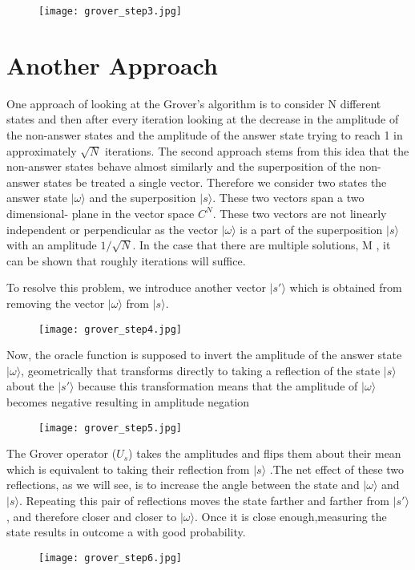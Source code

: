 \begin{figure}[!ht]
  \centering
  \texttt{[image: grover\_step3.jpg]}
\end{figure}


\section{Another Approach}
One approach of looking at the Grover's algorithm is to consider N different states and then after every iteration looking at the decrease in the amplitude of the non-answer states and the amplitude of the answer state trying to reach 1 in approximately $\sqrt{N}$ iterations.
The second approach stems from this idea that the non-answer states behave almost similarly and the superposition of the non-answer states be treated a single vector. Therefore we consider two states the answer state $|\omega\rangle$ and the superposition $|s\rangle$. These two vectors span a two dimensional- plane in the vector space $C^{N}$. These two vectors are not linearly independent or perpendicular as the vector $|\omega\rangle$ is a part of the superposition $|s\rangle$ with an amplitude $1/\sqrt{N}$. In the case that there are multiple solutions,  M , it can be shown that roughly  iterations will suffice.



To resolve this problem, we introduce another vector $|s'\rangle$ which is obtained from removing the vector $|\omega\rangle$ from $|s\rangle$.

\begin{figure}[ht]
  \centering
  \texttt{[image: grover\_step4.jpg]}
\end{figure}


Now, the oracle function is supposed to invert the amplitude of the answer state $|\omega\rangle$, geometrically that transforms directly to taking a  reflection of the state $|s\rangle$ about the $|s'\rangle$ because this transformation means that the amplitude of $|\omega\rangle$ becomes negative resulting in amplitude negation

\begin{figure}[h]
  \centering
  \texttt{[image: grover\_step5.jpg]}
\end{figure}

The Grover operator ($U_s$) takes the amplitudes and flips them about their mean which is equivalent to taking their reflection from $|s\rangle$ .The net effect of these two reflections, as we will see, is to increase the angle between the state and $|\omega\rangle$ and $|s\rangle$. Repeating this pair of reflections moves the
state farther and farther from $|s'\rangle$, and therefore closer and closer to $|\omega\rangle$. Once it is close enough,measuring the state results in outcome a with good probability.
\begin{figure}[h]
  \centering
  \texttt{[image: grover\_step6.jpg]}
\end{figure}
\pagebreak
